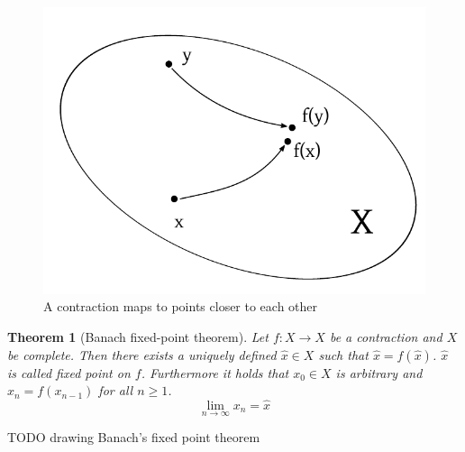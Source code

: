 \documentclass{article}
\newtheorem{theorem}{Theorem}  \numberwithin{theorem}{section}
\begin{document}
\begin{figure}
  \begin{center}
    \includegraphics{img/07_contraction.pdf}
    \caption{A contraction maps to points closer to each other}
    \label{img:contraction}
  \end{center}
\end{figure}

\begin{theorem}[Banach fixed-point theorem] %
  Let $f: X \to X$ be a contraction and $X$ be complete. Then there exists a uniquely defined $\hat{x} \in X$ such that $\hat{x} = f(\hat{x})$. $\hat{x}$ is called fixed point on $f$.
  Furthermore it holds that $x_0 \in X$ is arbitrary and $x_n = f(x_{n-1})$ for all $n \geq 1$.
  \[ \lim_{n \to \infty} x_n = \hat{x} \]
\end{theorem}

TODO drawing Banach's fixed point theorem
\end{document}
